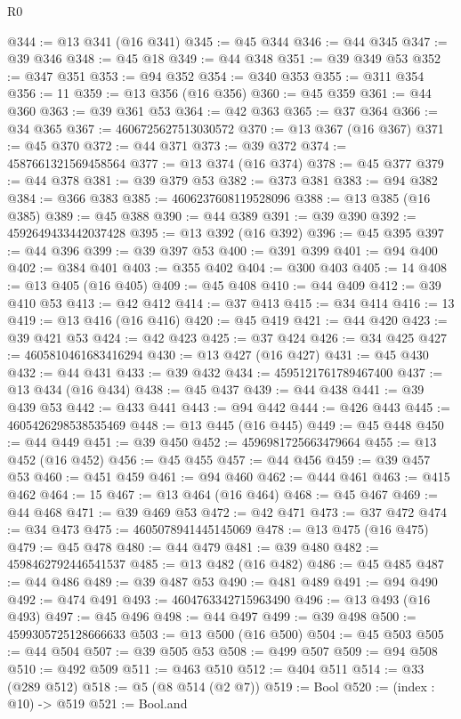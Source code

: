 \begin{lexlean}{R0}
\begin{coremodule}
@344 := @13 @341 (@16 @341)
@345 := @45 @344
@346 := @44 @345
@347 := @39 @346
@348 := @45 @18
@349 := @44 @348
@351 := @39 @349 @53
@352 := @347 @351
@353 := @94 @352
@354 := @340 @353
@355 := @311 @354
@356 := 11
@359 := @13 @356 (@16 @356)
@360 := @45 @359
@361 := @44 @360
@363 := @39 @361 @53
@364 := @42 @363
@365 := @37 @364
@366 := @34 @365
@367 := 4606725627513030572
@370 := @13 @367 (@16 @367)
@371 := @45 @370
@372 := @44 @371
@373 := @39 @372
@374 := 4587661321569458564
@377 := @13 @374 (@16 @374)
@378 := @45 @377
@379 := @44 @378
@381 := @39 @379 @53
@382 := @373 @381
@383 := @94 @382
@384 := @366 @383
@385 := 4606237608119528096
@388 := @13 @385 (@16 @385)
@389 := @45 @388
@390 := @44 @389
@391 := @39 @390
@392 := 4592649433442037428
@395 := @13 @392 (@16 @392)
@396 := @45 @395
@397 := @44 @396
@399 := @39 @397 @53
@400 := @391 @399
@401 := @94 @400
@402 := @384 @401
@403 := @355 @402
@404 := @300 @403
@405 := 14
@408 := @13 @405 (@16 @405)
@409 := @45 @408
@410 := @44 @409
@412 := @39 @410 @53
@413 := @42 @412
@414 := @37 @413
@415 := @34 @414
@416 := 13
@419 := @13 @416 (@16 @416)
@420 := @45 @419
@421 := @44 @420
@423 := @39 @421 @53
@424 := @42 @423
@425 := @37 @424
@426 := @34 @425
@427 := 4605810461683416294
@430 := @13 @427 (@16 @427)
@431 := @45 @430
@432 := @44 @431
@433 := @39 @432
@434 := 4595121761789467400
@437 := @13 @434 (@16 @434)
@438 := @45 @437
@439 := @44 @438
@441 := @39 @439 @53
@442 := @433 @441
@443 := @94 @442
@444 := @426 @443
@445 := 4605426298538535469
@448 := @13 @445 (@16 @445)
@449 := @45 @448
@450 := @44 @449
@451 := @39 @450
@452 := 4596981725663479664
@455 := @13 @452 (@16 @452)
@456 := @45 @455
@457 := @44 @456
@459 := @39 @457 @53
@460 := @451 @459
@461 := @94 @460
@462 := @444 @461
@463 := @415 @462
@464 := 15
@467 := @13 @464 (@16 @464)
@468 := @45 @467
@469 := @44 @468
@471 := @39 @469 @53
@472 := @42 @471
@473 := @37 @472
@474 := @34 @473
@475 := 4605078941445145069
@478 := @13 @475 (@16 @475)
@479 := @45 @478
@480 := @44 @479
@481 := @39 @480
@482 := 4598462792446541537
@485 := @13 @482 (@16 @482)
@486 := @45 @485
@487 := @44 @486
@489 := @39 @487 @53
@490 := @481 @489
@491 := @94 @490
@492 := @474 @491
@493 := 4604763342715963490
@496 := @13 @493 (@16 @493)
@497 := @45 @496
@498 := @44 @497
@499 := @39 @498
@500 := 4599305725128666633
@503 := @13 @500 (@16 @500)
@504 := @45 @503
@505 := @44 @504
@507 := @39 @505 @53
@508 := @499 @507
@509 := @94 @508
@510 := @492 @509
@511 := @463 @510
@512 := @404 @511
@514 := @33 (@289 @512)
@518 := @5 (@8 @514 (@2 @7))
@519 := Bool
@520 := (index : @10) -> @519
@521 := Bool.and

\end{coremodule}
\end{lexlean}
